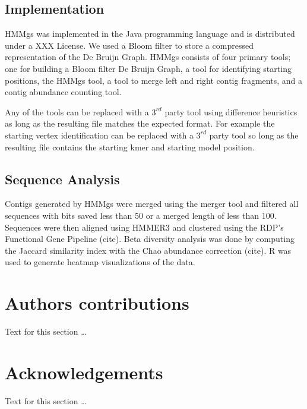 \documentclass[10pt]{bmc_article}
\newenvironment{bmcformat}{\begin{raggedright}\baselineskip20pt\sloppy\setboolean{publ}{false}}{\end{raggedright}\baselineskip20pt\sloppy}
\begin{document}
\begin{bmcformat}
\subsection*{Implementation}
HMMgs was implemented in the Java programming language and is distributed under a XXX License.  We used a Bloom filter to store a compressed representation of the De Bruijn Graph. HMMgs consists of four primary tools; one for building a Bloom filter De Bruijn Graph, a tool for identifying starting positions, the HMMgs tool, a tool to merge left and right contig fragments, and a contig abundance counting tool.

Any of the tools can be replaced with a $3^{rd}$ party tool using difference heuristics as long as the resulting file matches the expected format.  For example the starting vertex identification can be replaced with a $3^{rd}$ party tool so long as the resulting file contains the starting kmer and starting model position.

\subsection*{Sequence Analysis}
Contigs generated by HMMgs were merged using the merger tool and filtered all sequences with bits saved less than 50 or a merged length of less than 100.  Sequences were then aligned using HMMER3 and clustered using the RDP's Functional Gene Pipeline (cite).  Beta diversity analysis was done by computing the Jaccard similarity index with the Chao abundance correction (cite).  R was used to generate heatmap visualizations of the data.



    
\section*{Authors contributions}
    Text for this section \ldots

    

\section*{Acknowledgements}
  Text for this section \ldots


 



\end{bmcformat}
\end{document}
